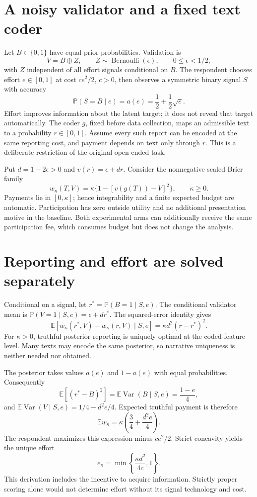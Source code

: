 \documentclass[11pt]{article}
\newcommand{\E}{\mathbb E}
\newcommand{\Prb}{\mathbb P}
\newcommand{\Var}{\operatorname{Var}}
\begin{document}
\section*{A noisy validator and a fixed text coder}
Let $B\in\{0,1\}$ have equal prior probabilities. Validation is
\[
 V=B\oplus Z,\qquad Z\sim\operatorname{Bernoulli}(\epsilon),
 \qquad 0\leq\epsilon<1/2,
\]
with $Z$ independent of all effort signals conditional on $B$. The respondent chooses effort $e\in[0,1]$ at cost $ce^2/2$, $c>0$, then observes a symmetric binary signal $S$ with accuracy
\[
 \Prb(S=B\mid e)=a(e)=\frac12+\frac12\sqrt e.
\]
Effort improves information about the latent target; it does not reveal that target automatically. The coder $g$, fixed before data collection, maps an admissible text to a probability $r\in[0,1]$. Assume every such report can be encoded at the same reporting cost, and payment depends on text only through $r$. This is a deliberate restriction of the original open-ended task.

Put $d=1-2\epsilon>0$ and $v(r)=\epsilon+dr$. Consider the nonnegative scaled Brier family
\[
 w_\kappa(T,V)=\kappa\{1-[v(g(T))-V]^2\},\qquad \kappa\geq0.
\]
Payments lie in $[0,\kappa]$; hence integrability and a finite expected budget are automatic. Participation has zero outside utility and no additional presentation motive in the baseline. Both experimental arms can additionally receive the same participation fee, which consumes budget but does not change the analysis.

\section*{Reporting and effort are solved separately}
Conditional on a signal, let $r^*=\Prb(B=1\mid S,e)$. The conditional validator mean is $\Prb(V=1\mid S,e)=\epsilon+dr^*$. The squared-error identity gives
\[
 \E[w_\kappa(r^*,V)-w_\kappa(r,V)\mid S,e]
 =\kappa d^2(r-r^*)^2.
\]
For $\kappa>0$, truthful posterior reporting is uniquely optimal at the coded-feature level. Many texts may encode the same posterior, so narrative uniqueness is neither needed nor obtained.

The posterior takes values $a(e)$ and $1-a(e)$ with equal probabilities. Consequently
\[
 \E[(r^*-B)^2]=\E\Var(B\mid S,e)=\frac{1-e}{4},
\]
and $\E\Var(V\mid S,e)=1/4-d^2e/4$. Expected truthful payment is therefore
\[
 \E w_\kappa=\kappa\left(\frac34+\frac{d^2e}{4}\right).
\]
The respondent maximizes this expression minus $ce^2/2$. Strict concavity yields the unique effort
\[
 e_\kappa=\min\left\{\frac{\kappa d^2}{4c},1\right\}.
\]
This derivation includes the incentive to acquire information. Strictly proper scoring alone would not determine effort without its signal technology and cost.
\end{document}
